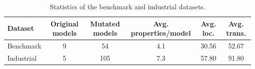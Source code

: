\begin{table}[t]
\caption{Statistics of the benchmark and industrial datasets.}
\label{tab:dataset-statistics}
\centering
\scriptsize
\setlength{\tabcolsep}{2pt}
\begin{tabular*}{\linewidth}{@{\extracolsep{\fill}}lccccc@{}}
\toprule
Dataset & Original models & Mutated models & Avg. properties/model &
Avg. loc. & Avg. trans. \\
\midrule
Benchmark & 9 & 54 & 4.1 & 30.56 & 52.67 \\
Industrial & 5 & 105 & 7.3 & 57.80 & 91.80 \\
\bottomrule
\end{tabular*}
\end{table}
